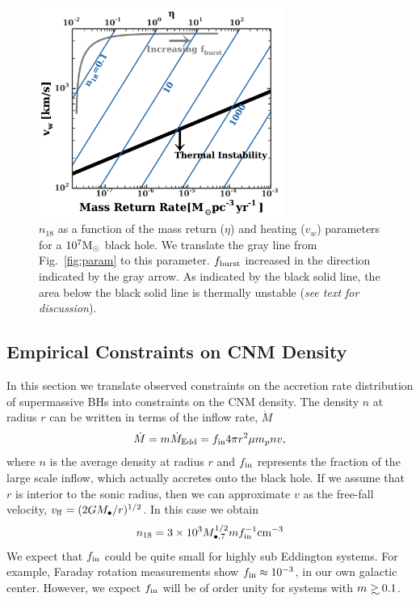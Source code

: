 \documentclass[usenatbib,fleqn]{mnras}
\newcommand\gsim{\mathrel{\rlap{\lower4pt\hbox{\hskip1pt$\sim$}}
    \raise1pt\hbox{$>$}}}
\newcommand{\Mbh}[1][]{M_{\bullet#1}}
\newcommand{\Msun}{{\rm M_\odot}}
\begin{document}
\begin{figure}
  \includegraphics[width=8cm]{cnm_plot_2.pdf}
  \caption{\label{fig:param2} $n_{18}$ as a function of the mass
    return ($\eta$) and heating ($v_w$) parameters for a $10^7 \Msun$
    black hole. We translate the gray line from Fig.~\ref{fig:param}
    to this parameter. $f_{\rm burst}$ increased in the direction
    indicated by the gray arrow. As indicated by the black solid line,
    the area below the black solid line is thermally unstable
    (\textit{see text for discussion}).}
\end{figure}

\subsection{Empirical Constraints on CNM Density}

In this section we translate observed constraints on the accretion
rate distribution of supermassive BHs into constraints on the CNM
density.  The density $n$ at radius $r$ can be written in terms of the
inflow rate, $\dot{M}$
\begin{equation}
\dot{M} = m \dot{M}_{\rm Edd}= f_{\rm in} 4 \pi r^2 \mu m_p n v,
\label{eq:mdot}
\end{equation}
where $n$ is the average density at radius $r$ and $f_{\rm in}$
represents the fraction of the large scale inflow, which actually
accretes onto the black hole.  If we assume that $r$ is interior to
the sonic radius, then we can approximate $v$ as the free-fall
velocity, $v_{\rm ff} = (2 G \Mbh/r)^{1/2}$.  In this case we
obtain
\begin{equation}
n_{18} = 3 \times 10^3 M_{\bullet,7}^{1/2} m f_{\rm in}^{-1} {\rm
  cm}^{-3}
\label{eq:n18Edd}
\end{equation}
We expect that $f_{\rm in}$ could be quite small for highly sub
Eddington systems. For example, Faraday rotation measurements
\citep{Quataert+2000} show $f_{\rm in}\approx 10^{-3}$, in our own
galactic center. However, we expect $f_{\rm in}$ will be of order
unity for systems with $m\gsim 0.1$.  
\end{document}
